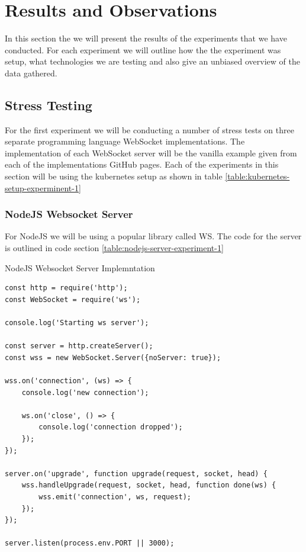 \chapter{Results and Observations}

In this section the we will present the results of the experiments that we have conducted. For each experiment we will outline how the the experiment was setup, what technologies we are testing and also give an unbiased overview of the data gathered.

\section{Stress Testing}

For the first experiment we will be conducting a number of stress tests on three separate programming language WebSocket implementations. The implementation of each WebSocket server will be the vanilla example given from each of the implementations GitHub pages. Each of the experiments in this section will be using the  kubernetes setup as shown in table \ref{table:kubernetes-setup-experminent-1}

\begin{table}[H]
\caption{Kubernetes Setup}
\label{table:kubernetes-setup-experminent-1}
\end{table}

\subsection{NodeJS Websocket Server}

For NodeJS we will be using a popular library called WS. The code for the server is outlined in code section \ref{table:nodejs-server-experiment-1}

\begin{listing}[H]
    \caption{NodeJS Websocket Server Implemntation}
    \label{table:nodejs-server-experiment-1}
    \begin{verbatim}
const http = require('http');
const WebSocket = require('ws');

console.log('Starting ws server');

const server = http.createServer();
const wss = new WebSocket.Server({noServer: true});

wss.on('connection', (ws) => {
    console.log('new connection');

    ws.on('close', () => {
        console.log('connection dropped');
    });
});

server.on('upgrade', function upgrade(request, socket, head) {
    wss.handleUpgrade(request, socket, head, function done(ws) {
        wss.emit('connection', ws, request);
    });
});

server.listen(process.env.PORT || 3000);
\end{verbatim}
\end{listing}

